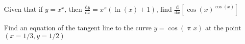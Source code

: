 \documentclass[10pt,fleqn]{exam}
\begin{document}
\begin{questions}

    \question Given that if $y = x^x$, then 
    $\displaystyle \frac{\mathrm{d} y}{\mathrm{d} x}
     = x^x (\ln(x)+1)$, find $\displaystyle \frac{\mathrm{d}} {\mathrm{d} x} 
     \left[ \cos(x)^{\cos(x)} \right] $
     
     \begin{solution}%
         
            
         \end{solution}

   \question Find an equation of the tangent line to the curve $y = \cos(\uppi x)$ 
   at the point \mbox{$(x=1/3, y=1/2)$}
\begin{solution}%
         
            
         \end{solution}

\end{questions}
\end{document}

